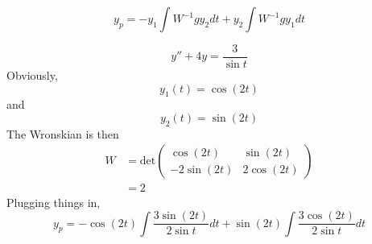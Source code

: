 \documentclass[12pt]{article}
\begin{document}
$$y_p = -y_1\int W^{-1}gy_2dt + y_2\int W^{-1}gy_1dt$$

\begin{ex}
	$$y'' + 4y = \frac{3}{\sin t}$$
	Obviously,
	$$y_1(t) = \cos(2t)$$
	and
	$$y_2(t) = \sin(2t)$$
	The Wronskian is then
	\begin{align*}
		W &= \text{det}\begin{pmatrix} \cos(2t) & \sin(2t) \\ -2\sin(2t) & 2\cos(2t)\end{pmatrix} \\
		  &= 2
	\end{align*}
	Plugging things in,
	$$y_p = -\cos(2t)\int\frac{3\sin(2t)}{2\sin t}dt + \sin(2t)\int\frac{3\cos(2t)}{2\sin t}dt$$
\end{ex}
\end{document}
